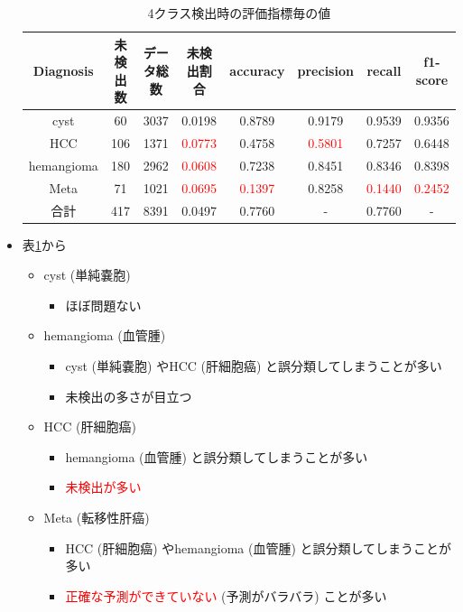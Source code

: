 \documentclass[a4j]{ujarticle}
\newcommand{\Tref}[1]{\mbox{表\ref{tab:#1}}}
\begin{document}
\begin{itemize}
            \begin{table}[h]
                \centering
                \caption{4クラス検出時の評価指標毎の値}
                \label{tab:metric}
                \begin{tabular}{c|cc|ccccc}
                    Diagnosis & 未検出数 & データ総数 & 未検出割合 & accuracy & precision & recall & f1-score \\ \hline
                    cyst & 60 & 3037 & 0.0198 & 0.8789 & 0.9179 & 0.9539 & 0.9356 \\
                    HCC & 106 & 1371 & \textcolor{red}{0.0773} & 0.4758 & \textcolor{red}{0.5801} & 0.7257 & 0.6448 \\
                    hemangioma & 180 & 2962 & \textcolor{red}{0.0608} & 0.7238 & 0.8451 & 0.8346 & 0.8398 \\
                    Meta & 71 & 1021 & \textcolor{red}{0.0695} & \textcolor{red}{0.1397} & 0.8258 & \textcolor{red}{0.1440} & \textcolor{red}{0.2452} \\ \hline
                    合計 & 417 & 8391 & 0.0497 & 0.7760 & - & 0.7760 & -
                \end{tabular}
            \end{table}

            \item \Tref{metric}から
            \begin{itemize}
                \item cyst (単純嚢胞)
                \begin{itemize}
                    \item ほぼ問題ない
                \end{itemize}
                \item hemangioma (血管腫)
                \begin{itemize}
                    \item cyst (単純嚢胞) やHCC (肝細胞癌) と誤分類してしまうことが多い
                    \item 未検出の多さが目立つ
                \end{itemize}
                \item HCC (肝細胞癌)
                \begin{itemize}
                    \item hemangioma (血管腫) と誤分類してしまうことが多い
                    \item \textcolor{red}{未検出が多い}
                \end{itemize}
                \item Meta (転移性肝癌)
                \begin{itemize}
                    \item HCC (肝細胞癌) やhemangioma (血管腫) と誤分類してしまうことが多い
                    \item \textcolor{red}{正確な予測ができていない} (予測がバラバラ) ことが多い
                \end{itemize}
            \end{itemize}

        \end{itemize}
\end{document}
